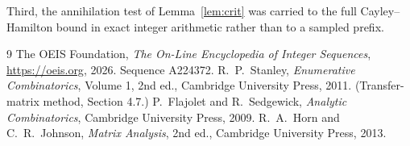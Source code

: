 \documentclass[11pt,a4paper]{article}
\theoremstyle{plain}
\theoremstyle{definition}
\begin{document}
Third, the annihilation test of Lemma~\ref{lem:crit} was carried to the full
Cayley--Hamilton bound in exact integer arithmetic rather than to a sampled prefix.

\begin{thebibliography}{9}
 The OEIS Foundation, \emph{The On-Line Encyclopedia of Integer
Sequences}, \url{https://oeis.org}, 2026. Sequence A224372.
 R.~P.~Stanley, \emph{Enumerative Combinatorics}, Volume 1, 2nd ed.,
Cambridge University Press, 2011. (Transfer-matrix method, Section 4.7.)
 P.~Flajolet and R.~Sedgewick, \emph{Analytic Combinatorics}, Cambridge
University Press, 2009.
 R.~A.~Horn and C.~R.~Johnson, \emph{Matrix Analysis}, 2nd ed., Cambridge
University Press, 2013.
\end{thebibliography}
\end{document}
